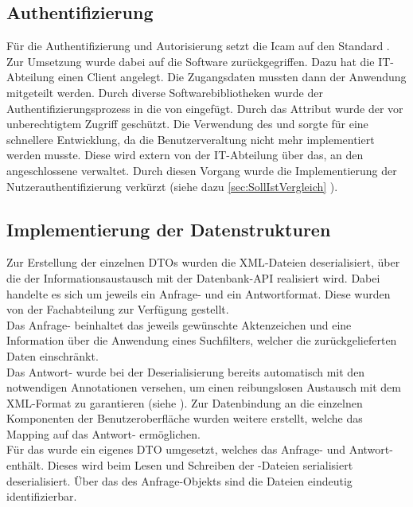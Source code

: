 \subsection{Authentifizierung}
\label{sec:Authentifizierung}
Für die Authentifizierung und Autorisierung setzt die \acs{Icam} auf den Standard .
Zur Umsetzung wurde dabei auf die Software  zurückgegriffen. Dazu hat die IT-Abteilung einen Client 
angelegt. Die Zugangsdaten mussten dann der Anwendung mitgeteilt werden. Durch diverse Softwarebibliotheken 
wurde der Authentifizierungsprozess in die  von  eingefügt. Durch das Attribut 
\Methode{[Authorize]} wurde der  vor unberechtigtem Zugriff geschützt. Die Verwendung 
des  und  sorgte für eine schnellere Entwicklung, da die Benutzerveraltung nicht mehr implementiert
werden musste. Diese wird extern von der IT-Abteilung über das, an den  angeschlossene 
 verwaltet. Durch diesen Vorgang wurde die Implementierung der Nutzerauthentifizierung 
verkürzt (siehe dazu \ref{sec:SollIstVergleich} ).


\subsection{Implementierung der Datenstrukturen}
\label{sec:ImplementierungDatenstrukturen}
Zur Erstellung der einzelnen \acs{DTO}s wurden die \acs{XML}-Dateien deserialisiert, über die der Informationsaustausch mit der Datenbank-\acs{API}
realisiert wird. Dabei handelte es sich um jeweils ein Anfrage- und ein Antwortformat. Diese wurden von der Fachabteilung zur Verfügung
gestellt.\\
Das Anfrage- beinhaltet das jeweils gewünschte Aktenzeichen und eine Information über die Anwendung eines Suchfilters,
welcher die zurückgelieferten Daten einschränkt.\\
Das Antwort- wurde bei der Deserialisierung bereits automatisch mit den notwendigen Annotationen versehen,
um einen reibungslosen Austausch mit dem \acs{XML}-Format zu garantieren (siehe ). Zur Datenbindung an die einzelnen Komponenten der
Benutzeroberfläche wurden weitere  erstellt, welche das Mapping auf das Antwort- ermöglichen.\\
Für das  wurde ein eigenes \acs{DTO} umgesetzt, welches das Anfrage- und Antwort- enthält.
Dieses wird beim Lesen und Schreiben der -Dateien serialisiert \bzw deserialisiert.
Über das  des Anfrage-Objekts sind die Dateien eindeutig identifizierbar.

